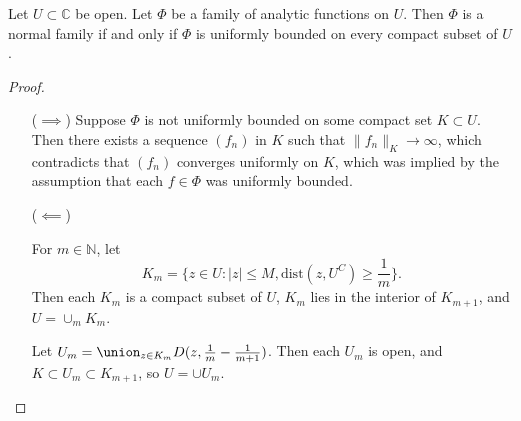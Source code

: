 \begin{theorem}
Let $U \subset \mathbb{C}$ be open. Let $\Phi$ be a family of
analytic functions on $U$. Then $\Phi$ is a normal family if and only
if $\Phi$ is uniformly bounded on every compact subset of $U$.
\end{theorem}

\begin{proof}
  \begin{itemize}
    \item[($\implies$)]{
      Suppose $\Phi$ is not uniformly bounded on some compact set $K
      \subset U$. Then there exists a sequence $(f_n)$ in $K$ such
      that $\| f_n \|_K \to \infty$, which contradicts that $(f_n)$
      converges uniformly on $K$, which was implied by the assumption
      that each $f \in \Phi$ was uniformly bounded.
    }
    \item[($\impliedby$)]{
      For $m \in \mathbb{N}$, let
      $$
        K_m
      = \{ z \in U : |z| \leq M, \mathrm{dist}(z, U^C) \geq
      \frac{1}{m} \}.
      $$
      Then each $K_m$ is a compact subset of $U$, $K_m$ lies in the
      interior of $K_{m+1}$, and $U = \cup_m K_m$.

      Let $U_m = \union_{z \in K_m} D(z, \frac{1}{m} - \frac{1}{m +
        1})$.
      Then each $U_m$ is open, and $K \subset U_m \subset K_{m+1}$, so
      $U = \cup U_m$.
    }
  \end{itemize}
\end{proof}
